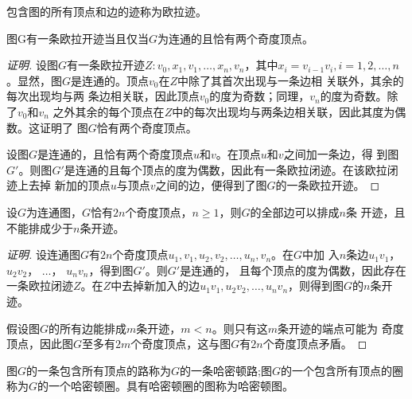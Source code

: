    \begin{Def}
    包含图的所有顶点和边的迹称为欧拉迹。
  \end{Def}
  \begin{Thm}
    图G有一条欧拉开迹当且仅当$G$为连通的且恰有两个奇度顶点。
  \end{Thm}
  \begin{proof}[证明]
      设图$G$有一条欧拉开迹$Z:v_0,x_1,v_1,\ldots, x_n,v_n$，其中$x_i=v_{i-1}v_i, i =
  1,2,\ldots, n$。显然，图$G$是连通的。顶点$v_0$在$Z$中除了其首次出现与一条边相
  关联外，其余的每次出现均与两
  条边相关联，因此顶点$v_0$的度为奇数；同理，$v_n$的度为奇数。除了$v_0$和$v_n$
  之外其余的每个顶点在$Z$中的每次出现均与两条边相关联，因此其度为偶数。这证明了
  图$G$恰有两个奇度顶点。

  设图$G$是连通的，且恰有两个奇度顶点$u$和$v$。在顶点$u$和$v$之间加一条边，得
  到图$G'$。则图$G'$是连通的且每个顶点的度为偶数，因此有一条欧拉闭迹。在该欧拉闭迹上去掉
  新加的顶点$u$与顶点$v$之间的边，便得到了图$G$的一条欧拉开迹。
  \end{proof}
  \begin{Thm}
    设$G$为连通图，$G$恰有$2n$个奇度顶点，$n \geq 1$，则$G$的全部边可以排成$n$条
    开迹，且不能排成少于$n$条开迹。  \end{Thm}
  \begin{proof}[证明]
      设连通图$G$有$2n$个奇度顶点$u_1,v_1,u_2,v_2,\ldots,u_n,v_n$。在$G$中加
  入$n$条边$u_1v_1$，　$u_2v_2$， $\ldots$， $u_nv_n$，得到图$G'$。则$G'$是连通的，
  且每个顶点的度为偶数，因此存在一条欧拉闭迹$Z$。在$Z$中去掉新加入的边$u_1v_1,
  u_2v_2, \ldots, u_nv_n$，则得到图$G$的$n$条开迹。

  假设图$G$的所有边能排成$m$条开迹，$m < n$。则只有这$m$条开迹的端点可能为
  奇度顶点，因此图$G$至多有$2m$个奇度顶点，这与图$G$有$2n$个奇度顶点矛盾。
\end{proof}
   \begin{Def}
    图$G$的一条包含所有顶点的路称为$G$的一条哈密顿路;图$G$的一个包含所有顶点的圈称为$G$的一个哈密顿圈。具有哈密顿圈的图称为哈密顿图。
  \end{Def}  
  \centering
